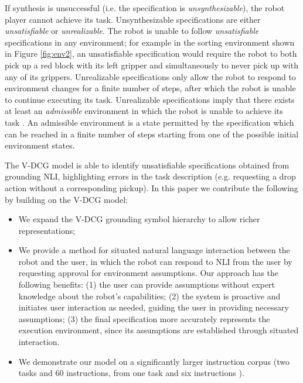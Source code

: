 \documentclass[letterpaper]{article} %
\begin{document}
If synthesis is unsuccessful (i.e. the specification is \textit{unsynthesizable}), the robot player cannot achieve its task. Unsynthesizable specifications are either \textit{unsatisfiable} or \textit{unrealizable}. 
The robot is unable to follow \textit{unsatisfiable} specifications in any environment; for example in the sorting environment shown in Figure \ref{fig:env2}, an unsatisfiable specification would require the robot to both pick up a red block with its left gripper and simultaneously to never pick up with any of its grippers. Unrealizable specifications only allow the robot to respond to environment changes for a finite number of steps, after which the robot is unable to continue executing its task. Unrealizable specifications imply that there exists at least an \textit{admissible} environment in which the robot is unable to achieve its task \cite{raman2013explaining}. An admissible environment is a state permitted by the specification which can be reached in a finite number of steps starting from one of the possible initial environment states.

The V-DCG model is able to identify unsatisfiable specifications obtained from grounding NLI, highlighting errors in the task description (e.g. requesting a drop action without a corresponding pickup).
In this paper we contribute the following by building on the V-DCG model:
\begin{itemize}[nolistsep,noitemsep]
\item We expand the V-DCG grounding symbol hierarchy to allow richer representations;

\item We provide a method for situated natural language interaction between the robot and the user, in which the robot can respond to NLI from the user by requesting approval for environment assumptions. Our approach has the following benefits: (1) the user can provide assumptions without expert knowledge about the robot's capabilities; (2) the system is proactive and initiates user interaction as needed, guiding the user in providing necessary assumptions; (3) the final specification more accurately represents the execution environment, since its assumptions are established through situated interaction.

\item We demonstrate our model on a significantly larger instruction corpus (two tasks and 60 instructions, from one task and six instructions \cite{boteanu2016model}).

\end{itemize}
\end{document}
